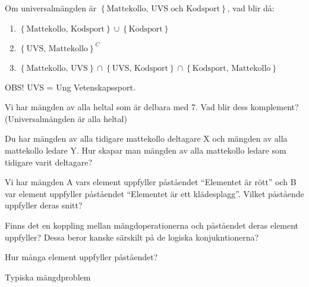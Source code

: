\begin{problem}
	Om universalmängden är \(\left\{\text{Mattekollo, UVS och Kodsport} \right\}\), vad blir då:
	\begin{enumerate}
		\item \(\left\{\text{Mattekollo, Kodsport} \right\} \cup \left\{\text{Kodsport} \right\}\) 
		\item \(\left\{\text{UVS, Mattekollo}\right\}^C\) 
		\item \(\left\{\text{Mattekollo, UVS}\right\} \cap \left\{\text{UVS, Kodsport} \right\} \cap \left\{\text{Kodsport, Mattekollo} \right\}\) 
	\end{enumerate}
	
	OBS! UVS = Ung Vetenskapssport.
\end{problem}

\begin{problem}
	Vi har mängden av alla heltal som är delbara med 7. Vad blir dess komplement? (Universalmängden är alla heltal)
\end{problem}

\begin{problem}
	Du har mängden av alla tidigare mattekollo deltagare X och mängden av alla mattekollo ledare Y. Hur skapar man mängden av alla mattekollo ledare som tidigare varit deltagare?
\end{problem}

\begin{problem}
	Vi har mängden A vars element uppfyller påståendet ``Elementet är rött'' och B var element uppfyller påståendet ``Elementet är ett klädesplagg''. Vilket påstående uppfyller deras snitt?
\end{problem}

\begin{problem}
	Finns det en koppling mellan mängdoperationerna och påståendet deras element uppfyller? Dessa beror kanske särskilt på de logiska konjukntionerna?
\end{problem}

\begin{problem}
	Hur många element uppfyller påståendet?
\end{problem}

\begin{problem}[Extra]
	Typiska mängdproblem
\end{problem}
